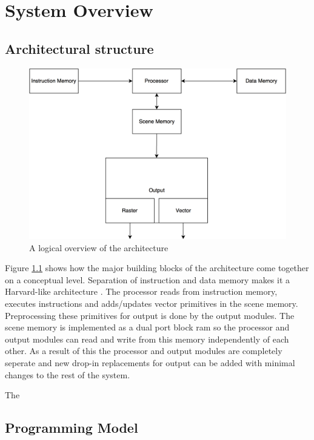 \chapter{System Overview}
\label{chp:system-overview}



\section{Architectural structure}

\begin{figure}[H]
    \includegraphics[width=\linewidth]{images/system-overview.png}
    \caption{A logical overview of the \vthreek architecture}
    \label{fig:system-overview}
\end{figure}

Figure \ref{fig:system-overview} shows how the major building blocks of the \vthreek architecture come together on a conceptual level.
Separation of instruction and data memory makes it a Harvard-like architecture \cite{structured-computer-organization}.
The processor reads from instruction memory, executes instructions and adds/updates vector primitives in the scene memory.
Preprocessing these primitives for output is done by the output modules. The scene memory is implemented as a dual port block ram so the processor and output modules can read and write from this memory independently of each other. As a result of this the processor and output modules are completely seperate and new drop-in replacements for output can be added with minimal changes to the rest of the system.

The 

\section{Programming Model}
\label{sec:programming-model}

